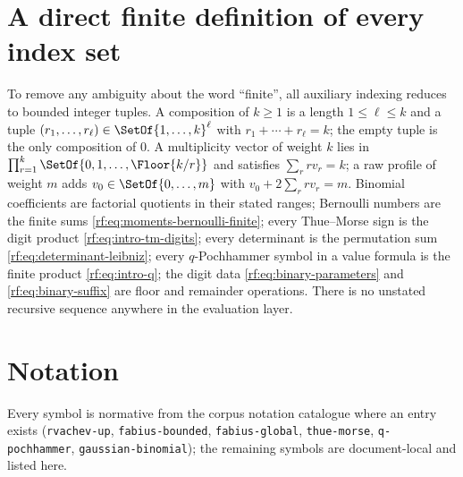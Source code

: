 \documentclass[11pt,oneside]{article}
\theoremstyle{plain}
\theoremstyle{definition}
\theoremstyle{remark}
\begin{document}
\section{A direct finite definition of every index set}
\label{rf:app:indices}

To remove any ambiguity about the word ``finite'', all auxiliary indexing
reduces to bounded integer tuples.  A composition of $k\ge1$ is a length
$1\le\ell\le k$ and a tuple $(r_{1},\ldots,r_{\ell})\in\SetOf{1,\ldots,k}^{\ell}$
with $r_{1}+\cdots+r_{\ell}=k$; the empty tuple is the only composition of
$0$.  A multiplicity vector of weight $k$ lies in
$\prod_{r=1}^{k}\SetOf{0,1,\ldots,\Floor{k/r}}$ and satisfies
$\sum_{r}rv_{r}=k$; a raw profile of weight $m$ adds
$v_{0}\in\SetOf{0,\ldots,m}$ with $v_{0}+2\sum_{r}rv_{r}=m$.  Binomial
coefficients are factorial quotients in their stated ranges; Bernoulli
numbers are the finite sums \cref{rf:eq:moments-bernoulli-finite}; every
Thue--Morse sign is the digit product \cref{rf:eq:intro-tm-digits}; every
determinant is the permutation sum \cref{rf:eq:determinant-leibniz}; every
$q$-Pochhammer symbol in a value formula is the finite product
\cref{rf:eq:intro-q}; the digit data \cref{rf:eq:binary-parameters} and
\cref{rf:eq:binary-suffix} are floor and remainder operations.  There is no
unstated recursive sequence anywhere in the evaluation layer.

\section{Notation}
\label{rf:sec:notation}

Every symbol is normative from the corpus notation catalogue where an entry
exists (\texttt{rvachev-up}, \texttt{fabius-bounded},
\texttt{fabius-global}, \texttt{thue-morse}, \texttt{q-pochhammer},
\texttt{gaussian-binomial}); the remaining symbols are document-local and
listed here.
\end{document}
